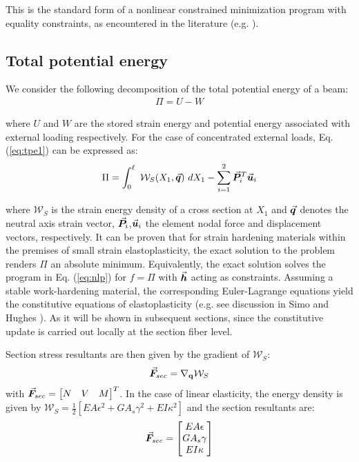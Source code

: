 \noindent This is the standard form of a nonlinear constrained minimization
program with equality constraints, as encountered in the literature (e.g. 
\cite{Luenberger}).

\subsection{Total potential energy}\label{subsection:CH2-S3SS2}

We consider the following decomposition of the total potential energy of a beam:
\begin{gather}
	\Pi = U - W
	\label{eq:tpe1}
\end{gather}

\noindent where $U$ and $W$ are the stored strain energy and potential energy
associated with external loading respectively. For the case of concentrated
external loads, Eq. (\ref{eq:tpe1}) can be expressed as:
\begin{gather}
	\Pi = \int_0^\ell\ \mathcal{W}_S(X_1,\vec{\boldsymbol{q}})\ dX_1 - 
	\sum_{i=1}^2\vec{\boldsymbol{P}}_i^T\vec{\boldsymbol{u}}_i
	\label{eq:tpe2}
\end{gather}

\noindent where $\mathcal{W}_S$ is the strain energy density of a cross section
at $X_1$ and $\vec{\boldsymbol{q}}$ denotes the neutral axis strain vector, 
$\vec{\boldsymbol{P}}_i$,$\vec{\boldsymbol{u}}_i$ the element nodal force and
displacement vectors, respectively. It can be proven\cite{Washizu} that for 
strain hardening materials
within the premises of small strain elastoplasticity, the exact solution to the 
problem renders $\Pi$ an absolute minimum.
Equivalently, the exact solution solves the program
in Eq. (\ref{eq:nlp}) for $f=\Pi$ with $\vec{\boldsymbol{h}}$ acting as constraints.
Assuming a stable
work-hardening material, the corresponding Euler-Lagrange equations yield the
constitutive equations of elastoplasticity (e.g. see discussion in Simo and 
Hughes
\cite{SimoHughes}). As it will be shown in subsequent sections, since the
constitutive update is carried out locally at the section fiber level.

Section stress
resultants are then given by the gradient of $\mathcal{W}_S$:
\begin{gather}
	\vec{\boldsymbol{F}}_{sec} = \nabla_{\mathbf{q}} \mathcal{W}_S
\end{gather}
with $\vec{\boldsymbol{F}}_{sec} = \begin{bmatrix} N & V & M \end{bmatrix}^T$.
\noindent In the case of linear elasticity, the energy density is
given by $\mathcal{W}_S = \frac{1}{2}[ EA\epsilon^2 + GA_s\gamma^2 +
EI\kappa^2]$  and the section resultants are:
\begin{gather*}
	\vec{\boldsymbol{F}}_{sec} = \begin{bmatrix}
		EA\epsilon\\
		GA_s\gamma\\
		EI\kappa
	\end{bmatrix}
\end{gather*}

